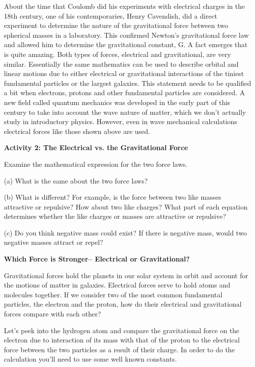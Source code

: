 About the time that Coulomb did his experiments with electrical charges in the
18th century, one of his contemporaries, Henry Cavendish, did a direct experiment
to determine the nature of the gravitational force between two spherical masses
in a laboratory. This confirmed Newton's gravitational force law and allowed
him to determine the gravitational constant, G. A fact emerges that is quite
amazing. Both types of forces, electrical and gravitational, are very similar.
Essentially the same mathematics can be used to describe orbital and linear
motions due to either electrical or gravitational interactions of the tiniest
fundamental particles or the largest galaxies. This statement needs to be qualified
a bit when electrons, protons and other fundamental particles are considered.
A new field called quantum mechanics was developed in the early part of this
century to take into account the wave nature of matter, which we don't actually
study in introductory physics. However, even in wave mechanical calculations
electrical forces like those shown above are used. 

\textbf{Activity 2: The Electrical vs. the Gravitational Force} 

Examine the mathematical expression for the two force laws.

(a) What is the same about the two force laws?
\vspace{20mm}

(b) What is different? For example, is the force between two like masses attractive
or repulsive? How about two like charges? What part of each equation determines
whether the like charges or masses are attractive or repulsive?
\vspace{20mm}

(c) Do you think negative mass could exist? If there is negative mass, would
two negative masses attract or repel?
\vspace{20mm}

\textbf{Which Force is Stronger-- Electrical or Gravitational?} 

Gravitational forces hold the planets in our solar system in orbit and account
for the motions of matter in galaxies. Electrical forces serve to hold atoms
and molecules together. If we consider two of the most common fundamental particles,
the electron and the proton, how do their electrical and gravitational forces
compare with each other?

Let's peek into the hydrogen atom and compare the gravitational force on the
electron due to interaction of its mass with that of the proton to the electrical
force between the two particles as a result of their charge. In order to do
the calculation you'll need to use some well known constants.

